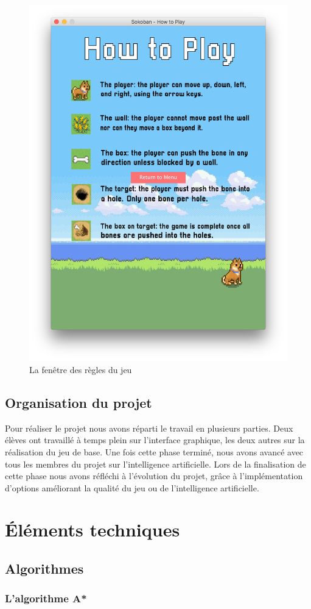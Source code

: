 \documentclass[a4paper, 11pt]{report}
\begin{document}
\begin{figure}[h!]
\centering
\includegraphics[width=.6\textwidth]{images/rules.png}%
\caption{La fenêtre des règles du jeu}
\label{figure:rules}
\end{figure}


\newpage

\section{Organisation du projet}

Pour réaliser le projet nous avons réparti le travail en plusieurs parties. Deux élèves ont travaillé à temps plein sur l'interface graphique, les deux autres sur la réalisation du jeu de base. Une fois cette phase terminé, nous avons avancé avec tous les membres du projet sur l'intelligence artificielle. Lors de la finalisation de cette phase nous avons réfléchi à l'évolution du projet, grâce à l'implémentation d'options améliorant la qualité du jeu ou de l'intelligence artificielle.

\chapter{Éléments techniques}

\section{Algorithmes}

\subsection{L'algorithme A*}
\end{document}
